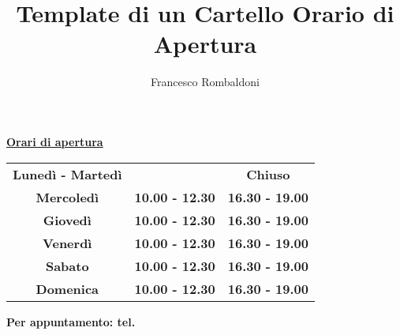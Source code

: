 \documentclass[hidelinks,12pt,a4paper]{article}
\newcommand{\entry}[3]{
	{\textbf{\huge{#1}}}&{\textbf{\huge{#2}}}&{\textbf{\huge{#3}}}\\
}
\newcommand{\hourSign}{
	\begin{center}
		\fboxrule=2pt
		\begin{adjustbox}{minipage=0.9\textwidth,precode=\dbox}
			\begin{roundCornerPage}[roundcorner=15pt]
				\begin{minipage}[t][0.7\textwidth][t]{\textwidth}
					\vspace*{5mm}
					\begin{center}
						
						{\fontsize{30pt}{36pt}\selectfont \textbf{\underline{Orari di apertura}}} 
						 
					\end{center}
					
						\vspace*{1.5cm}
						\begin{tabular*}{\linewidth}{ c c c }
							\entry{Lunedì - Martedì}{}{Chiuso}
							\entry{Mercoledì}{10.00 - 12.30}{16.30 - 19.00}
							\entry{Giovedì}{10.00 - 12.30}{16.30 - 19.00}
							\entry{Venerdì}{10.00 - 12.30}{16.30 - 19.00}
							\entry{Sabato}{10.00 - 12.30}{16.30 - 19.00}
							\entry{Domenica}{10.00 - 12.30}{16.30 - 19.00}
						\end{tabular*}
				\vspace*{2cm}
				\begin{center}
					{\Large
						\textbf{Per appuntamento: tel. } 
					}
				\end{center}
				
				\end{minipage}
			\end{roundCornerPage}
		\end{adjustbox}
	\end{center}
}
\begin{document}
	\pagestyle{empty}
	
	\title{\textbf{Template di un Cartello Orario di Apertura}}
	\author{Francesco Rombaldoni}
	\date{}
	
	\maketitle
	\newpage
	
	\hourSign
	
	\newpage
	\vspace*{\fill}
	\begin{center}
		\begin{minipage}{0.8\linewidth}
			\doclicenseThis
		\end{minipage}
	\end{center}
	
\end{document}
